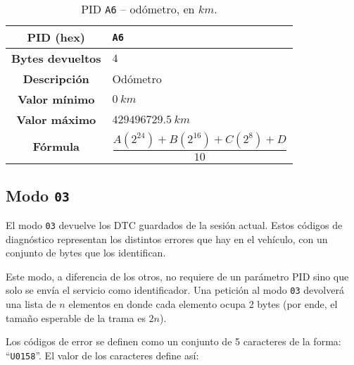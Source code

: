 \begin{table}[H]
  \centering
  \begin{tabularx}{\textwidth}{|c|X|}
    \hline
    \textbf{PID (hex)}       & \texttt{A6}      \\
    \hline
    \textbf{Bytes devueltos} & $4$              \\
    \hline
    \textbf{Descripción}     & Odómetro         \\
    \hline
    \textbf{Valor mínimo}    & $0~km$           \\
    \hline
    \textbf{Valor máximo}    & $429496729.5~km$ \\
    \hline
    \textbf{Fórmula}         &                  %
    \begin{equation*}
      \frac{A\left(2^{24}\right) + B\left(2^{16}\right) + C\left(2^8\right) + D}{10}
    \end{equation*}                  \\
    \hline
  \end{tabularx}
  \caption{\ac{PID} \texttt{A6} -- odómetro, en $km$.}
\end{table}

\subsection*{Modo \texttt{03}}
El modo \texttt{03} devuelve los \ac{DTC} guardados de la sesión actual. Estos códigos
de diagnóstico representan los distintos errores que hay en el vehículo, con un conjunto
de bytes que los identifican.

Este modo, a diferencia de los otros, no requiere de un parámetro \ac{PID} sino que solo
se envía el servicio como identificador. Una petición al modo \texttt{03} devolverá una
lista de $n$ elementos en donde cada elemento ocupa 2 bytes (por ende, el tamaño
esperable de la trama es $2n$).

Los códigos de error se definen como un conjunto de 5 caracteres de la forma: ``\texttt{U0158}''.
El valor de los caracteres define así:

